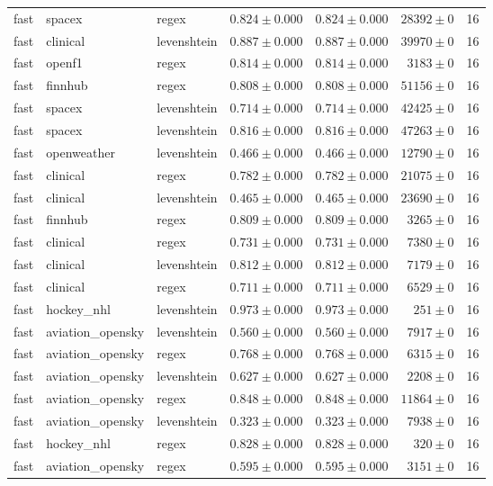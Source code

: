 \begin{table}[htbp]
\begin{tabular}{l l l r r r r}
fast & spacex & regex & $0.824\pm0.000$ & $0.824\pm0.000$ & $28392\pm0$ & 16 \\
fast & clinical & levenshtein & $0.887\pm0.000$ & $0.887\pm0.000$ & $39970\pm0$ & 16 \\
fast & openf1 & regex & $0.814\pm0.000$ & $0.814\pm0.000$ & $3183\pm0$ & 16 \\
fast & finnhub & regex & $0.808\pm0.000$ & $0.808\pm0.000$ & $51156\pm0$ & 16 \\
fast & spacex & levenshtein & $0.714\pm0.000$ & $0.714\pm0.000$ & $42425\pm0$ & 16 \\
fast & spacex & levenshtein & $0.816\pm0.000$ & $0.816\pm0.000$ & $47263\pm0$ & 16 \\
fast & openweather & levenshtein & $0.466\pm0.000$ & $0.466\pm0.000$ & $12790\pm0$ & 16 \\
fast & clinical & regex & $0.782\pm0.000$ & $0.782\pm0.000$ & $21075\pm0$ & 16 \\
fast & clinical & levenshtein & $0.465\pm0.000$ & $0.465\pm0.000$ & $23690\pm0$ & 16 \\
fast & finnhub & regex & $0.809\pm0.000$ & $0.809\pm0.000$ & $3265\pm0$ & 16 \\
fast & clinical & regex & $0.731\pm0.000$ & $0.731\pm0.000$ & $7380\pm0$ & 16 \\
fast & clinical & levenshtein & $0.812\pm0.000$ & $0.812\pm0.000$ & $7179\pm0$ & 16 \\
fast & clinical & regex & $0.711\pm0.000$ & $0.711\pm0.000$ & $6529\pm0$ & 16 \\
fast & hockey\_nhl & levenshtein & $0.973\pm0.000$ & $0.973\pm0.000$ & $251\pm0$ & 16 \\
fast & aviation\_opensky & levenshtein & $0.560\pm0.000$ & $0.560\pm0.000$ & $7917\pm0$ & 16 \\
fast & aviation\_opensky & regex & $0.768\pm0.000$ & $0.768\pm0.000$ & $6315\pm0$ & 16 \\
fast & aviation\_opensky & levenshtein & $0.627\pm0.000$ & $0.627\pm0.000$ & $2208\pm0$ & 16 \\
fast & aviation\_opensky & regex & $0.848\pm0.000$ & $0.848\pm0.000$ & $11864\pm0$ & 16 \\
fast & aviation\_opensky & levenshtein & $0.323\pm0.000$ & $0.323\pm0.000$ & $7938\pm0$ & 16 \\
fast & hockey\_nhl & regex & $0.828\pm0.000$ & $0.828\pm0.000$ & $320\pm0$ & 16 \\
fast & aviation\_opensky & regex & $0.595\pm0.000$ & $0.595\pm0.000$ & $3151\pm0$ & 16 \\

\end{tabular}
\end{table}
